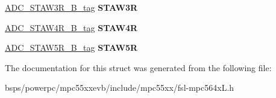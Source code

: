 \begin{DoxyCompactItemize}
\mbox{\hyperlink{unionADC__STAW3R__32B__tag}{A\+D\+C\+\_\+\+S\+T\+A\+W3\+R\+\_\+B\+\_\+tag}} {\bfseries S\+T\+A\+W3R}
\item 
\mbox{\label{structADC__struct__tag_ae5030f2f942ae9630c691f48b8f2e6f6}} 
\mbox{\hyperlink{unionADC__STAW4R__32B__tag}{A\+D\+C\+\_\+\+S\+T\+A\+W4\+R\+\_\+B\+\_\+tag}} {\bfseries S\+T\+A\+W4R}
\item 
\mbox{\label{structADC__struct__tag_adcfb78189c3e285618eb8de22c58b559}} 
\mbox{\hyperlink{unionADC__STAW5R__32B__tag}{A\+D\+C\+\_\+\+S\+T\+A\+W5\+R\+\_\+B\+\_\+tag}} {\bfseries S\+T\+A\+W5R}
\end{DoxyCompactItemize}


The documentation for this struct was generated from the following file\+:\begin{DoxyCompactItemize}
\item 
bsps/powerpc/mpc55xxevb/include/mpc55xx/fsl-\/mpc564x\+L.\+h\end{DoxyCompactItemize}

